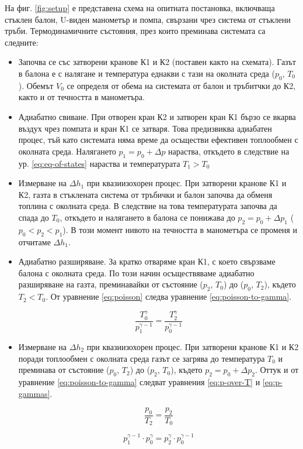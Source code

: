 \documentclass[12pt]{article}
\begin{document}
На фиг. \ref{fig:setup} е представена схема на опитната постановка, включваща стъклен балон, U-виден манометър и помпа, свързани чрез система от стъклени тръби. Термодинамичните състояния, през които преминава системата са следните:
\begin{itemize}
    \item Започва се със затворени кранове К1 и К2 (поставен както на схемата). Газът в балона е с налягане и температура еднакви с тази на околната среда ($p_0$, $T_0$). Обемът $V_0$ се определя от обема на системата от балон и тръбитчки до К2, както и от течността в манометъра. 
    \item Адиабатно свиване. При отворен кран К2 и затворен кран К1 бързо се вкарва въздух чрез помпата и кран К1 се затваря. Това предизвиква адиабатен процес, тъй като системата няма време да осъществи ефективен топлообмен с околната среда. Налягането $p_1 = p_0 + \Delta p$ нараства, откъдето в следствие на ур. \ref{eq:eq-of-states} нараства и температурата $T_1 > T_0$
    \item Измерване на $\Delta h_1$ при квазиизохорен процес. При затворени кранове К1 и К2, газта в стъклената система от тръбички и балон започва да обменя топлина с околната среда. В следствие на това температурата започва да спада до $T_0$, откъдето и налягането в балона се понижава до $p_2 = p_0 + \Delta p_1$ ($p_0 < p_2 < p_1$). В този момент нивото на течността в манометъра се променя и отчитаме $\Delta h_1$.
    \item Адиабатно разширяване. За кратко отваряме кран К1, с което свързваме балона с околната среда. По този начин осъществяваме адиабатно разширяване на газта, преминавайки от състояние ($p_2$, $T_0$) до ($p_0$, $T_2$), където $T_2 < T_0$. От уравнение \ref{eq:poisson} следва уравнение \ref{eq:poisson-to-gamma}.

    \begin{equation}\label{eq:poisson-to-gamma}
        \frac{T_0^\gamma}{p_1^{\gamma-1}} = \frac{T_2^\gamma}{p_0^{\gamma-1}}
    \end{equation}
    
    \item Измерване на $\Delta h_2$ при квазиизохорен процес. При затворени кранове К1 и К2 поради топлообмен с околната среда газът се загрява до температура $T_0$ и преминава от състояние ($p_0$, $T_2$) до ($p_2$, $T_0$), където $p_2 = p_0 + \Delta p_2$. Оттук и от уравнение \ref{eq:poisson-to-gamma} следват уравнения \ref{eq:p-over-T} и \ref{eq:p-gammas}.

    \begin{equation}\label{eq:p-over-T}
        \frac{p_0}{T_2} = \frac{p_2}{T_0}
    \end{equation}
    
    \begin{equation}\label{eq:p-gammas}
        p_1^{\gamma - 1}\cdot p_0^\gamma = p_2^\gamma \cdot p_0^{\gamma-1}
    \end{equation}
\end{itemize}
\end{document}
